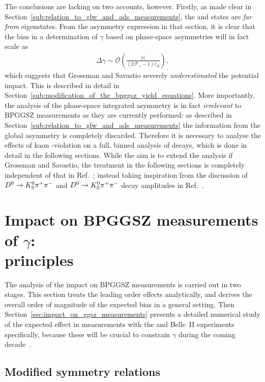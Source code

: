 The conclusions are lacking on two accounts, however. Firstly, as made clear in Section~\ref{sub:relation_to_glw_and_ads_measurements}, the \Kspipi and \KsKK states are \emph{far from} \CP eigenstates. From the asymmetry expression in that section, it is clear that the bias in a determination of $\gamma$ based on phase-space asymmetries will in fact scale as 
\begin{align}
  \Delta \gamma \sim \mathcal O \left(
  \frac{|\epsilon|}
  {(2\mathcal F_+ -1)r_B}
  \right),
\end{align} which suggests that Grossman and Savastio severely \emph{underestimated} the potential impact. This is described in detail in Section~\ref{sub:modification_of_the_bpggsz_yield_equations}. More importantly, the analysis of the phase-space integrated asymmetry is in fact \emph{irrelevant} to BPGGSZ measurements as they are currently performed: as described in Section~\ref{sub:relation_to_glw_and_ads_measurements} the information from the global asymmetry is completely discarded. Therefore it is necessary to analyse the effects of kaon \CP-violation on a full, binned analysis of \DtoKshh decays, which is done in detail in the following sections. While the aim is to extend the analysis if Grossman and Savastio, the treatment in the following sections is completely independent of that in Ref.~\cite{grossmanEffectsBarMixing2014}; instead taking inspiration from the discussion of ${{D}^0}\rightarrow{\ensuremath{{K}^0_{\mathrm{S}}}}{\ensuremath{{\pi}^+}}{\ensuremath{{\pi}^-}}$ and ${{D}^0}\rightarrow{\ensuremath{{K}^0_{\mathrm{S}}}}{\ensuremath{{\pi}^+}}{\ensuremath{{\pi}^-}}$ decay amplitudes in Ref.~\cite{CLEOCISI}.

\section{\texorpdfstring{Impact on BPGGSZ measurements of $\gamma$: \\principles}{Impact on BPGGSZ measurements of gamma: principles}}%
\label{sec:impact_on_}

The analysis of the impact on BPGGSZ measurements is carried out in two stages. This section treats the leading order effects analytically, and derives the overall order of magnitude of the expected bias in a general setting. Then Section~\ref{sec:impact_on_ggsz_measurements} presents a detailed numerical study of the expected effect in measurements with the \lhcb and Belle~II experiments specifically, because these will be crucial to constrain $\gamma$ during the coming decade~\cite{kouBelleIIPhysics2019,lhcbcollaborationPhysicsCaseLHCb2019}. 

\subsection{Modified symmetry relations} %
\label{sub:modified_symmetry_relations}

